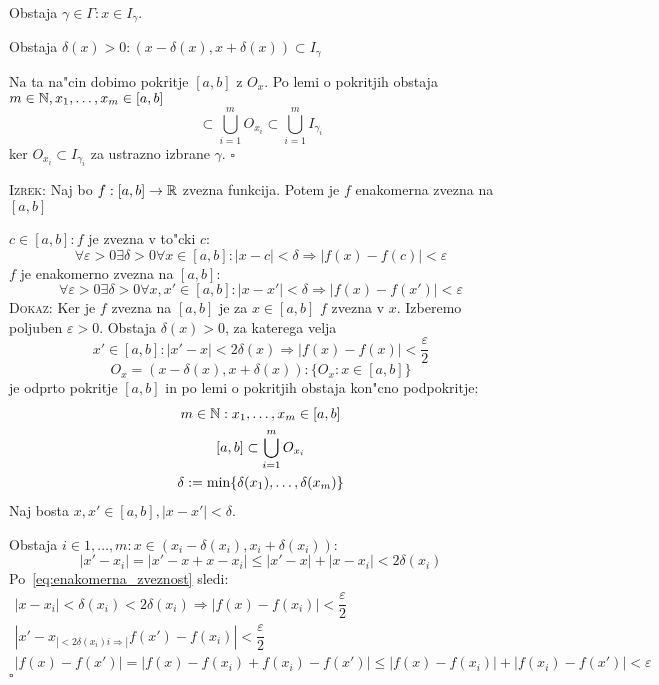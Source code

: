 Obstaja $\gamma \in \Gamma: x \in I_\gamma$.

Obstaja $\delta(x) > 0: (x - \delta(x), x + \delta(x)) \subset I_\gamma$

Na ta na"cin dobimo pokritje $[a, b]$ z $O_x$. Po lemi o pokritjih obstaja $m \in \mathbb{N}, x_1, \ldots, x_m \in [a, b]$
\begin{equation*}
[a, b] \subset \bigcup_{i=1}^m O_{x_i} \subset \bigcup_{i=1}^m I_{\gamma_i}
\end{equation*}
ker $O_{x_i} \subset I_{\gamma_i}$ za ustrazno izbrane $\gamma$. \hfill $\square$

\textsc{Izrek:} Naj bo $f: [a, b] \to \mathbb{R}$ zvezna funkcija. Potem je $f$ enakomerna zvezna na $[a, b]$

$c \in [a, b]: f$ je zvezna v to"cki $c$:
\begin{equation*}
\forall \varepsilon > 0 \exists \delta > 0 \forall x \in [a, b]: |x - c| < \delta \Rightarrow |f(x) - f(c)| < \varepsilon
\end{equation*}
$f$ je enakomerno zvezna na $[a, b]$:
\begin{equation*}
\forall \varepsilon > 0 \exists \delta > 0 \forall x, x' \in [a, b]: |x - x'| < \delta \Rightarrow |f(x) - f(x')| < \varepsilon
\end{equation*}
\textsc{Dokaz:} Ker je $f$ zvezna na $[a, b]$ je za $x \in [a, b]$ $f$ zvezna v $x$. Izberemo poljuben $\varepsilon > 0$. Obstaja $\delta(x) > 0$, za katerega velja
\begin{equation}
\label{eq:enakomerna_zveznost}
x' \in [a, b]: |x' - x| < 2\delta(x) \Rightarrow |f(x) - f(x)| < \dfrac{\varepsilon}{2}
\end{equation}
\begin{equation*}
O_x = (x - \delta(x), x + \delta(x)): \{O_x: x \in [a, b]\}
\end{equation*}
je odprto pokritje $[a, b]$ in po lemi o pokritjih obstaja kon"cno podpokritje:
\begin{gather*}
m \in \mathbb{N}: x_1, \ldots, x_m \in [a, b] \\
[a, b] \subset \bigcup_{i=1}^m O_{x_i} \\
\delta := \min \{\delta(x_1), \ldots, \delta(x_m)\}
\end{gather*}
Naj bosta $x, x' \in [a, b], |x - x'| < \delta$.

Obstaja $i \in {1, \ldots, m}: x \in (x_i - \delta(x_i), x_i + \delta(x_i))$:
\begin{equation*}
|x' - x_i| = |x' -x + x - x_i| \leq |x' - x| + |x - x_i| < 2 \delta(x_i)
\end{equation*}
Po~\eqref{eq:enakomerna_zveznost} sledi:
\begin{gather*}
|x - x_i| < \delta(x_i) < 2\delta(x_i) \Rightarrow |f(x) - f(x_i)| < \dfrac{\varepsilon}{2} \\
|x' - x_| < 2\delta(x_i)i \Rightarrow |f(x') - f(x_i)| < \dfrac{\varepsilon}{2} \\
|f(x) - f(x')| = |f(x) - f(x_i) + f(x_i) - f(x')| \leq |f(x) - f(x_i)| + |f(x_i) - f(x')| < \varepsilon
\end{gather*}
\hfill $\square$
%
